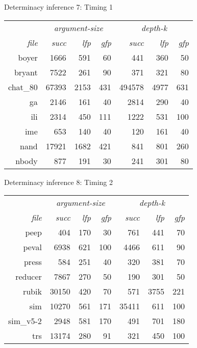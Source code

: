 \documentclass{beamer}
\begin{document}
\begin{frame}{Determinacy inference 7: Timing 1}
\vspace{\fill}

\begin{tabular}{@{}r@{}|r@{\,\,}r@{\,\,}r|r@{\,\,}r@{\,\,}r@{}} &
\multicolumn{3}{c}{\emph{argument-size}} &
\multicolumn{3}{|c}{\emph{depth-k}} \\
\emph{file} &
\emph{succ} & \emph{lfp} & \emph{gfp} & \emph{succ} & \emph{lfp} & \emph{gfp} \\
\hline
boyer & 1666 & 591 & 60 & 441 & 360 & 50 \\
bryant & 7522 & 261 & 90 & 371 & 321 & 80 \\
chat\_80 & 67393 & 2153 & 431 & 494578 & 4977 & 631 \\
ga & 2146 & 161 & 40 & 2814 & 290 & 40 \\
ili & 2314 & 450 & 111 & 1222 & 531 & 100 \\
ime & 653 & 140 & 40 & 120 & 161 & 40 \\
nand & 17921 & 1682 & 421 & 841 & 801 & 260 \\
nbody & 877 & 191 & 30 & 241 & 301 & 80
\end{tabular}
\vspace{\fill}

\end{frame}

\begin{frame}{Determinacy inference 8: Timing 2}
\vspace{\fill}

\begin{tabular}{@{}r@{}|r@{\,\,}r@{\,\,}r|r@{\,\,}r@{\,\,}r@{}}  &
\multicolumn{3}{c}{\emph{argument-size}} &
\multicolumn{3}{|c}{\emph{depth-k}} \\
\emph{file} &  \emph{succ} & \emph{lfp} & \emph{gfp} & \emph{succ}
& \emph{lfp} & \emph{gfp} \\ \hline
peep &  404 & 170 & 30 & 761 & 441 & 70 \\
peval & 6938 & 621 & 100 & 4466 & 611 & 90 \\
press & 584 & 251 & 40 & 320 & 381 & 70 \\
reducer & 7867 & 270 & 50 & 190 & 301 & 50 \\
rubik & 30150 & 420 & 70 & 571 & 3755 & 221 \\
sim & 10270 & 561 & 171 & 35411 & 611 & 100 \\
sim\_v5-2 & 2948 & 581 & 170 & 491 & 701 & 180 \\
trs & 13174 & 280 & 91 & 321 & 450 & 100
\end{tabular}
\vspace{\fill}

\end{frame}
\end{document}
